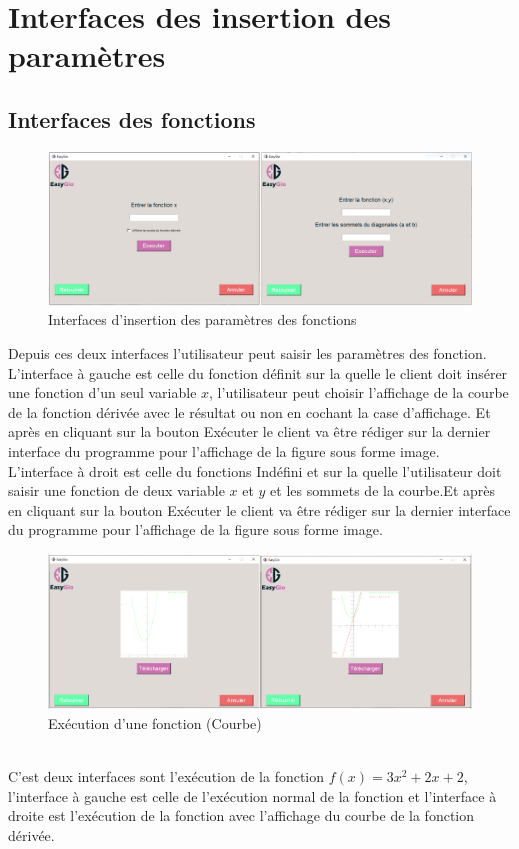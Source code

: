 \documentclass[a4paper]{report}
\begin{document}
\section{Interfaces des insertion des paramètres}
\subsection{Interfaces des fonctions}
\begin{figure}[!h]
    \centering
    \includegraphics[width=15cm]{images/InputesInter.PNG}
    \caption{Interfaces d'insertion des paramètres des fonctions}
    \label{fig:Interfaces d'insertion des paramètres des fonctions}
\end{figure}
Depuis ces deux interfaces l'utilisateur peut saisir les paramètres des fonction.\\
L'interface à gauche est celle du fonction définit sur la quelle le client doit insérer une fonction d'un seul variable $x$, l'utilisateur peut choisir l'affichage de la courbe de la fonction dérivée avec le résultat ou non en cochant la case d'affichage. Et après en cliquant sur la bouton Exécuter le client va être rédiger sur la dernier interface du programme pour l'affichage de la figure sous forme image.\\
L'interface à droit est celle du fonctions Indéfini et sur la quelle l'utilisateur doit saisir une fonction de deux variable $x$ et $y$ et les sommets de la courbe.Et après en cliquant sur la bouton Exécuter le client va être rédiger sur la dernier interface du programme pour l'affichage de la figure sous forme image.\\
\begin{figure}[!h]
    \centering
    \includegraphics[width=15cm]{images/Fonction.PNG}
    \caption{Exécution d'une fonction (Courbe)}
    \label{fig:Exécution d'une fonction (Courbe)}
\end{figure}\\
C'est deux interfaces sont l'exécution de la fonction $f(x)=3x^2+2x+2$, l'interface à gauche est celle de l'exécution normal de la fonction et l'interface à droite est l'exécution de la fonction avec l'affichage du courbe de la fonction dérivée.
\newpage
\end{document}
